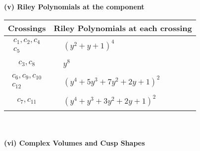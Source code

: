 \documentclass[1p]{elsarticle_modified}
\theoremstyle{definition}
\begin{document}
\newpage\renewcommand{\arraystretch}{1}
\flushleft \textbf{(v) Riley Polynomials at the component}\newline \\
\begin{tabular}{m{50pt}|m{274pt}}
Crossings & \hspace{64pt}Riley Polynomials at each crossing \\
\hline $$\begin{aligned}c_{1},c_{2},c_{4}\\c_{5}\end{aligned}$$&$\begin{aligned}
&(y^2+y+1)^4
\end{aligned}$\\
\hline $$\begin{aligned}c_{3},c_{8}\end{aligned}$$&$\begin{aligned}
&y^8
\end{aligned}$\\
\hline $$\begin{aligned}c_{6},c_{9},c_{10}\\c_{12}\end{aligned}$$&$\begin{aligned}
&(y^4+5 y^3+7 y^2+2 y+1)^2
\end{aligned}$\\
\hline $$\begin{aligned}c_{7},c_{11}\end{aligned}$$&$\begin{aligned}
&(y^4+y^3+3 y^2+2 y+1)^2
\end{aligned}$\\
\hline
\end{tabular}\\~\\
\newpage\flushleft \textbf{(vi) Complex Volumes and Cusp Shapes}
\end{document}

